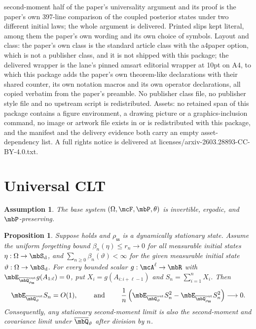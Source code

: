\documentclass[10pt,a4paper]{amsart}
\numberwithin{equation}{section}   %
\theoremstyle{plain}   %
\theoremstyle{plain}   %
\newtheorem{assumption}{Assumption}     %
\newtheorem{prop}[lemma]{Proposition}   %
\theoremstyle{examplestyle}
\DeclareMathOperator{\states}{\mbS_d}   %
\DeclareMathOperator{\pr}{\mbP}           %
\newcommand{\s}{\rho_{\mathsf{ss}}}     %
\begin{document}
second-moment half of the paper's universality argument and its proof is the paper's own 397-line comparison of the coupled posterior states under two different initial laws; the whole argument is delivered. Printed slips kept literal, among them the paper's own wording and its own choice of symbols. Layout and class: the paper's own class is the standard article class with the a4paper option, which is not a publisher class, and it is not shipped with this package; the delivered wrapper is the lane's pinned amsart editorial wrapper at 10pt on A4, to which this package adds the paper's own theorem-like declarations with their shared counter, its own notation macros and its own operator declarations, all copied verbatim from the paper's preamble. No publisher class file, no publisher style file and no upstream script is redistributed. Assets: no retained span of this package contains a figure environment, a drawing picture or a graphics-inclusion command, no image or artwork file exists in or is redistributed with this package, and the manifest and the delivery evidence both carry an empty asset-dependency list. A full rights notice is delivered at licenses/arxiv-2603.28893-CC-BY-4.0.txt.
\setcounter{section}{4}
\section{Universal CLT}

\setcounter{lemma}{3}
\setcounter{equation}{4}
    \begin{assumption}
    \label{assumption1}
        The base system \((\Omega,\mcF,\pr,\theta)\) is invertible, ergodic, and \(\pr\)-preserving.
    \end{assumption}

\begin{prop}
\label{univ:prop:moments}
    Suppose  holds and $\s$ is a dynamically stationary state. 
    Assume the uniform forgetting bound $\beta_n(\eta)\le r_n\to0$ for all measurable initial states $\eta:\Omega\to\states$, and $\sum_{n\ge0}\beta_n(\vartheta)<\infty$ for the given measurable initial state $\vartheta:\Omega\to\states$. 
    For every bounded scalar $g:\mcA^\ell\to\mbR$ with $\mbE_{\overline\mbQ^{\mathrm{out}}_{\s}} g(A_{1:\ell})=0$, put $X_i=g(A_{i:i+\ell-1})$ and $S_n=\sum_{i=1}^nX_i$. Then
    \[
     \mbE_{ \overline\mbQ^{\mathrm{out}}_\vartheta} S_n=O(1),
     \qquad \text{ and }\qquad
     \frac1n\left(\mbE_{ \overline\mbQ^{\mathrm{out}}_\vartheta} S_n^2-\mbE_{ \overline\mbQ^{\mathrm{out}}_{\s}} S_n^2\right)\longrightarrow0.
    \]
    Consequently, any stationary second-moment limit is also the second-moment and covariance limit under $\overline\mbQ_\vartheta$ after division by $n$.
\end{prop}
\end{document}
